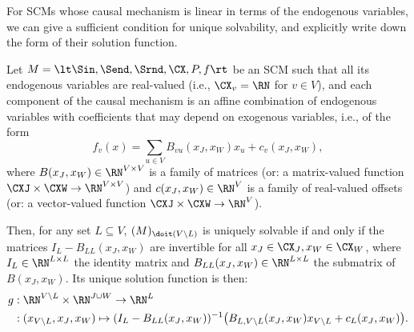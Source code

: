 For SCMs whose causal mechanism is linear in terms of the endogenous variables, we can
give a sufficient condition for unique solvability, and explicitly write down the form
of their solution function.
\begin{Prp}\label{prp:linear_scms}
Let $M=\lt \Sin, \Send, \Srnd, \CX, P, f \rt$ be an SCM such that all its
endogenous variables are real-valued (i.e., $\CX_v = \RN$ for $v \in V$), and each
component of the causal mechanism is an affine combination of endogenous variables
with coefficients that may depend on exogenous variables, i.e., of the form
$$
  f_v(x) = \sum_{u\in V} B_{vu}(x_J,x_W) x_u + c_v(x_J,x_W),
$$
where $B(x_J,x_W)\in\RN^{V \times V}$ is a family of matrices (or: a matrix-valued function $\CXJ\times\CXW \to \RN^{V\times V}$) and
$c(x_J,x_W) \in \RN^V$ is a family of real-valued offsets (or: a vector-valued function $\CXJ\times\CXW \to \RN^V$).

Then, for any set $L \subseteq V$,
$(M)_{\doit(V\setminus L)}$ is uniquely solvable if and only if the matrices 
$I_{L}-B_{LL}(x_J,x_W)$ are invertible for all $x_J \in \CX_J, x_W \in \CX_W$,
where $I_L \in \RN^{L \times L}$ the identity matrix and 
$B_{LL}(x_J,x_W) \in \RN^{L \times L}$ the submatrix of $B(x_J,x_W)$.
Its unique solution function is then:
  \begin{equation*}\begin{split}
    g &: \RN^{V\setminus L} \times \RN^{J\cup W} \to \RN^L \\
      &: (x_{V\setminus L},x_J,x_W) \mapsto (I_L - B_{LL}(x_J,x_W))^{-1} \big(B_{L,{V\setminus L}}(x_J,x_W) x_{V\setminus L} + c_{L}(x_J,x_W)\big).
  \end{split}\end{equation*}
\end{Prp}

